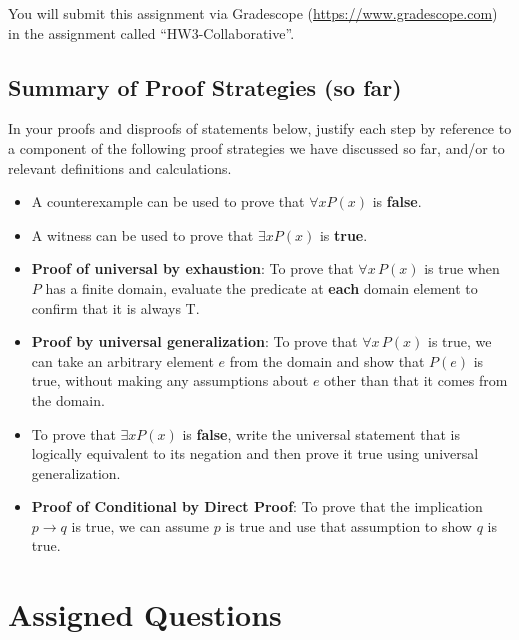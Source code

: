 \documentclass[12pt, oneside]{article}
\begin{document}
You will submit this assignment via Gradescope
(\href{https://www.gradescope.com}{https://www.gradescope.com}) in the assignment called ``HW3-Collaborative''.

\subsection*{Summary of Proof Strategies (so far)}
In your proofs and disproofs of statements below, justify each  step
by reference to  a component of the  following proof  strategies
we  have discussed so far, and/or to relevant definitions and calculations.
\begin{itemize}
    \item A counterexample can be used to prove that  $\forall x P(x)$ is {\bf false}.
    \item  A witness can be used  to  prove that  $\exists x P(x)$ is {\bf true}.
    \item {\bf Proof of universal by exhaustion}: To prove that $\forall x \, P(x)$
is true when $P$ has a finite domain, evaluate the predicate at {\bf each} domain element to confirm that it is always T.
    \item  {\bf Proof by universal generalization}: To prove that $\forall x \, P(x)$
is true, we can take an arbitrary element $e$ from the domain and show that $P(e)$ is true, without making any assumptions about $e$ other than that it comes from the domain.
    \item To  prove  that $\exists x P(x)$ is {\bf false}, write the universal statement that is logically equivalent to its negation and then prove it true using universal generalization.
   
    \item {\bf Proof of Conditional by Direct Proof}: To prove that the implication $p \to q$ is true, we can assume $p$ is true and use that assumption to show $q$ is true.

   
\end{itemize}

\newpage
\section*{Assigned Questions}
\end{document}
